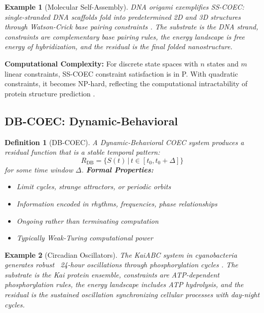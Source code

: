 \documentclass[11pt]{article}
\newtheorem{definition}{Definition}
\newtheorem{example}{Example}
\begin{document}
\begin{example}[Molecular Self-Assembly]
DNA origami exemplifies SS-COEC: single-stranded DNA scaffolds fold into predetermined 2D and 3D structures through Watson-Crick base pairing constraints \citep{rothemund2006folding}. The substrate is the DNA strand, constraints are complementary base pairing rules, the energy landscape is free energy of hybridization, and the residual is the final folded nanostructure.
\end{example}

\textbf{Computational Complexity:} For discrete state spaces with $n$ states and $m$ linear constraints, SS-COEC constraint satisfaction is in P. With quadratic constraints, it becomes NP-hard, reflecting the computational intractability of protein structure prediction \citep{crescenzi1998complexity}.

\subsection{DB-COEC: Dynamic-Behavioral}

\begin{definition}[DB-COEC]
A Dynamic-Behavioral COEC system produces a residual function that is a stable temporal pattern:
\begin{equation}
R_{\text{DB}} = \{S(t) \,|\, t \in [t_0, t_0+\Delta]\}
\end{equation}
for some time window $\Delta$.
\textbf{Formal Properties:}
\begin{itemize}
\item Limit cycles, strange attractors, or periodic orbits
\item Information encoded in rhythms, frequencies, phase relationships
\item Ongoing rather than terminating computation
\item Typically Weak-Turing computational power
\end{itemize}
\end{definition}

\begin{example}[Circadian Oscillators]
The KaiABC system in cyanobacteria generates robust ~24-hour oscillations through phosphorylation cycles \citep{nakajima2005reconstitution}. The substrate is the Kai protein ensemble, constraints are ATP-dependent phosphorylation rules, the energy landscape includes ATP hydrolysis, and the residual is the sustained oscillation synchronizing cellular processes with day-night cycles.
\end{example}
\end{document}
